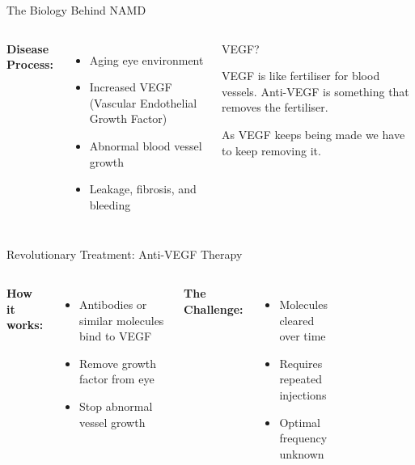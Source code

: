 \documentclass[10pt,aspectratio=169]{beamer}
\begin{document}
\begin{frame}{The Biology Behind NAMD}
\begin{columns}[T]
\textbf{Disease Process:}
\begin{itemize}
    \item Aging eye environment
    \item Increased VEGF (Vascular Endothelial Growth Factor)
    \item Abnormal blood vessel growth
    \item Leakage, fibrosis, and bleeding
\end{itemize}

\begin{exampleblock}{VEGF?}

  VEGF is like fertiliser for blood vessels. Anti-VEGF is something that removes the fertiliser.

  As VEGF keeps being made we have to keep removing it.
  \end{exampleblock}
\end{columns}
\end{frame}

\begin{frame}{Revolutionary Treatment: Anti-VEGF Therapy}
\begin{columns}[T]
\textbf{How it works:}
\begin{itemize}
    \item Antibodies or similar molecules bind to VEGF
    \item Remove growth factor from eye
    \item Stop abnormal vessel growth
\end{itemize}

\vspace{0.5cm}
\alert{\textbf{The Challenge:}}
\begin{itemize}
    \item Molecules cleared over time
    \item Requires repeated injections
    \item Optimal frequency unknown
\end{itemize}

\begin{figure}
    \centering
\end{figure}
\end{columns}
\end{frame}
\end{document}
